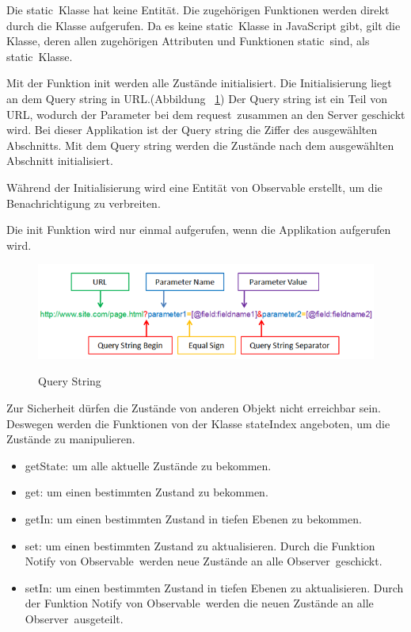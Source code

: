   Die \glqq static\grqq\ Klasse hat keine Entität. Die zugehörigen Funktionen werden direkt durch die Klasse aufgerufen. Da es keine \glqq static\grqq\ Klasse in JavaScript gibt, gilt die Klasse, deren allen zugehörigen Attributen und Funktionen \glqq static\grqq\ sind, als \glqq static\grqq\ Klasse.
  
  Mit der Funktion {\selectfont init}  werden alle Zustände initialisiert. Die Initialisierung liegt an dem Query string in URL.(Abbildung ~\ref{fig:queryString}) Der Query string ist ein Teil von URL, wodurch der Parameter bei dem \glqq request\grqq\ zusammen an den Server geschickt wird. Bei dieser Applikation ist der Query string die Ziffer des ausgewählten Abschnitts. Mit dem Query string werden die Zustände nach dem ausgewählten Abschnitt initialisiert.
  
  Während der Initialisierung wird eine Entität von {\selectfont Observable} erstellt, um die Benachrichtigung zu verbreiten.
  
  Die {\selectfont init} Funktion wird nur einmal aufgerufen, wenn die Applikation aufgerufen wird.
  
\begin{figure}[ht]
\centering
\caption[Query String]{Query String}
\includegraphics[width=\textwidth]{images/queryString.png}
\label{fig:queryString} 
\end{figure}
  
  Zur Sicherheit dürfen die Zustände von anderen Objekt nicht erreichbar sein. Deswegen werden die Funktionen von der Klasse {\selectfont stateIndex} angeboten, um die Zustände zu manipulieren.
  
  \begin{itemize}
      \item {\selectfont getState}: um alle aktuelle Zustände zu bekommen.
      \item {\selectfont get}: um einen bestimmten Zustand zu bekommen.
      \item {\selectfont getIn}: um einen bestimmten Zustand in tiefen Ebenen zu bekommen.
      \item {\selectfont set}: um einen bestimmten Zustand zu aktualisieren. Durch die Funktion {\selectfont Notify} von \glqq Observable\grqq\ werden neue Zustände an alle \glqq Observer\grqq\ geschickt.
      \item {\selectfont setIn}: um einen bestimmten Zustand in tiefen Ebenen zu aktualisieren. Durch der Funktion {\selectfont Notify} von \glqq Observable\grqq\ werden die neuen Zustände an alle \glqq Observer\grqq\ ausgeteilt.
  \end{itemize}
  
